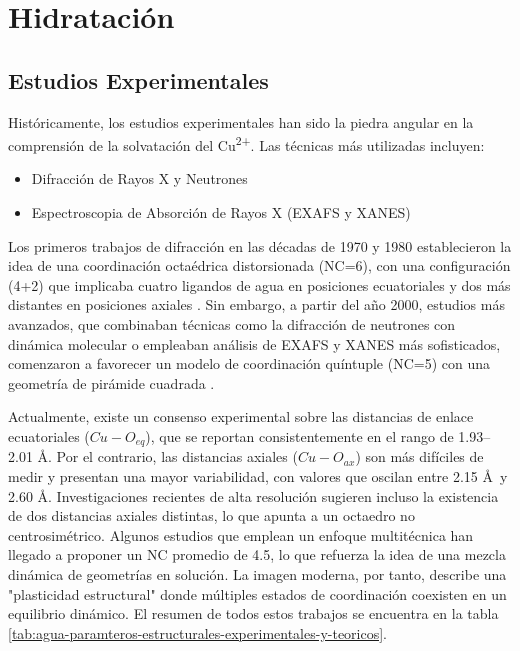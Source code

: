 \section{Hidratación}

    \subsection*{Estudios Experimentales}

    Históricamente, los estudios experimentales han sido la piedra angular en la comprensión de la solvatación del Cu\textsuperscript{2+}. Las técnicas más utilizadas incluyen:
    \begin{itemize}
        \item Difracción de Rayos X y Neutrones
        \item Espectroscopia de Absorción de Rayos X (EXAFS y XANES)
    \end{itemize}

    Los primeros trabajos de difracción en las décadas de 1970 y 1980 establecieron la idea de una coordinación octaédrica distorsionada (NC=6), con una configuración (4+2) que implicaba cuatro ligandos de agua en posiciones ecuatoriales y dos más distantes en posiciones axiales \cite{Wa-1988-01}. Sin embargo, a partir del año 2000, estudios más avanzados, que combinaban técnicas como la difracción de neutrones con dinámica molecular o empleaban análisis de EXAFS y XANES más sofisticados, comenzaron a favorecer un modelo de coordinación quíntuple (NC=5) con una geometría de pirámide cuadrada \cite{Wa-2001-01, Wa-2002-01}.

    Actualmente, existe un consenso experimental sobre las distancias de enlace ecuatoriales ($Cu-O_{eq}$), que se reportan consistentemente en el rango de 1.93--2.01 \AA. Por el contrario, las distancias axiales ($Cu-O_{ax}$) son más difíciles de medir y presentan una mayor variabilidad, con valores que oscilan entre 2.15 \AA \ y 2.60 \AA. Investigaciones recientes de alta resolución sugieren incluso la existencia de dos distancias axiales distintas, lo que apunta a un octaedro no centrosimétrico. Algunos estudios que emplean un enfoque multitécnica han llegado a proponer un NC promedio de 4.5, lo que refuerza la idea de una mezcla dinámica de geometrías en solución. La imagen moderna, por tanto, describe una "plasticidad estructural" donde múltiples estados de coordinación coexisten en un equilibrio dinámico. El resumen de todos estos trabajos se encuentra en la tabla \ref{tab:agua-paramteros-estructurales-experimentales-y-teoricos}.

